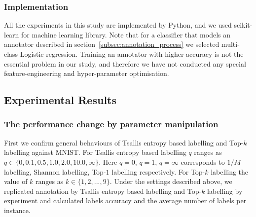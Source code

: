 \documentclass[a4paper,conference]{IEEEtran}
\begin{document}
\subsubsection{Implementation}\label{subsec:implementation}
All the experiments in this study are implemented by Python, and we used scikit-learn for machine learning library.
Note that for a classifier that models an annotator described in section~\ref{subsec:annotation_process} we selected multi-class Logistic regression. 
Training an annotator with higher accuracy is not the essential problem in our study, and therefore we have not conducted any special feature-engineering and hyper-parameter optimisation.

\subsection{Experimental Results}
\subsubsection{The performance change by parameter manipulation}\label{subsec:preliminary_exp}
First we confirm general behaviours of Tsallis entropy based labelling and Top-$k$ labelling against MNIST.
For Tsallis entropy based labelling $q$ ranges as $q\in\{0, 0.1, 0.5, 1.0, 2.0, 10.0, \infty\}$.
Here $q = 0$, $q = 1$, $q = \infty$ corresponds to $1/M$ labelling, Shannon labelling, Top-$1$ labelling respectively.
For Top-$k$ labelling the value of $k$ ranges as $k\in\{1, 2, ..., 9\}$.
Under the settings described above, we replicated annotation by Tsallis entropy based labelling and Top-$k$ labelling by experiment and calculated labels accuracy and the average number of labels per instance.
 
\end{document}
